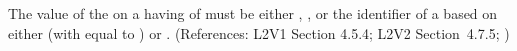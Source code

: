 The value of the   on a \Compartment having
 of  must be either ,
, or the identifier of a \UnitDefinition based on
either  (with  equal to ) or
.  (References: L2V1 Section 4.5.4; L2V2
Section~4.7.5; )
